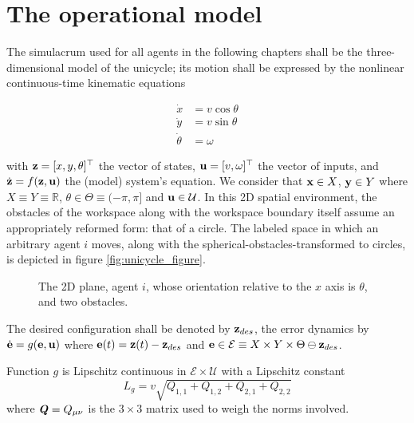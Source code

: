 \section{The operational model}

The simulacrum used for all agents in the following chapters shall be the
three-dimensional model of the unicycle; its motion shall be expressed by the
nonlinear continuous-time kinematic equations

\begin{align}
  \dot{x}       &= v \cos\theta \\
  \dot{y}       &= v \sin\theta \\
  \dot{\theta}  &= \omega
\label{eq:unicycle_kinematic}
\end{align}

with $\bm{\mathbf{z}} = [x,y,\theta]^{\top}$ the vector of states,
$\bm{\mathbf{u}} = [v, \omega]^{\top}$ the vector of inputs, and $\dot{\bm{\mathbf{z}}} =
f(\bm{\mathbf{z}}, \bm{\mathbf{u}})$ the (model) system's equation. We consider that
$\bm{\mathbf{x}} \in X$, $\bm{\mathbf{y}} \in Y$ where $X \equiv Y \equiv \mathbb{R}$,
$\theta \in \Theta \equiv (-\pi, \pi]$ and $\bm{\mathbf{u}} \in \mathcal{U}$.
In this 2D spatial environment, the obstacles of the workspace along with the
workspace boundary itself assume an appropriately reformed form: that of a
circle. The labeled space in which an arbitrary agent $i$ moves, along with the
spherical-obstacles-transformed to circles, is depicted in figure
\eqref{fig:unicycle_figure}.

\begin{figure}[H]\centering
  
  \caption{The 2D plane, agent $i$, whose orientation relative to the $x$
    axis is $\theta$, and two obstacles.}
  \label{fig:unicycle_figure}
\end{figure}

The desired configuration shall be denoted by $\bm{\mathbf{z}}_{des}$,
the error dynamics by $\dot{\bm{\mathbf{e}}} = g(\bm{\mathbf{e}}, \bm{\mathbf{u}})$
where $\bm{\mathbf{e}}(t) = \bm{\mathbf{z}}(t) - \bm{\mathbf{z}}_{des}$ and
$\bm{\mathbf{e}} \in \mathcal{E} \equiv X \times Y \times \Theta \ominus \bm{\mathbf{z}}_{des}$.

\begin{lemma}
  \label{lemma:lipschitz_unicycle}
  Function $g$ is Lipschitz continuous in $\mathcal{E} \times \mathcal{U}$ with
  a Lipschitz constant $$L_g = v \sqrt{Q_{1,1}+Q_{1,2}+Q_{2,1}+Q_{2,2}}$$
  where $\bm{\mathit{Q}} = Q_{\mu\nu}$ is the $3 \times 3$ matrix used to weigh the
  norms involved.
\end{lemma}
